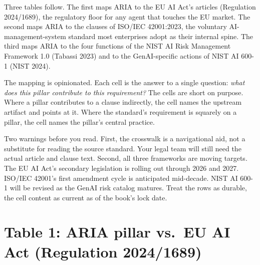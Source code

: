\label{ch:crosswalk}

\starttwocol

Three tables follow. The first maps ARIA to the EU AI Act's articles (Regulation 2024/1689), the regulatory floor for any agent that touches the EU market. The second maps ARIA to the clauses of ISO/IEC 42001:2023, the voluntary AI-management-system standard most enterprises adopt as their internal spine. The third maps ARIA to the four functions of the NIST AI Risk Management Framework 1.0 (Tabassi 2023) and to the GenAI-specific actions of NIST AI 600-1 (NIST 2024).

The mapping is opinionated. Each cell is the answer to a single question: \textit{what does this pillar contribute to this requirement?} The cells are short on purpose. Where a pillar contributes to a clause indirectly, the cell names the upstream artifact and points at it. Where the standard's requirement is squarely on a pillar, the cell names the pillar's central practice.

Two warnings before you read. First, the crosswalk is a navigational aid, not a substitute for reading the source standard. Your legal team will still need the actual article and clause text. Second, all three frameworks are moving targets. The EU AI Act's secondary legislation is rolling out through 2026 and 2027. ISO/IEC 42001's first amendment cycle is anticipated mid-decade. NIST AI 600-1 will be revised as the GenAI risk catalog matures. Treat the rows as durable, the cell content as current as of the book's lock date.

\stoptwocol

\TNrule

\section*{Table 1: ARIA pillar vs.\ EU AI Act (Regulation 2024/1689)}

